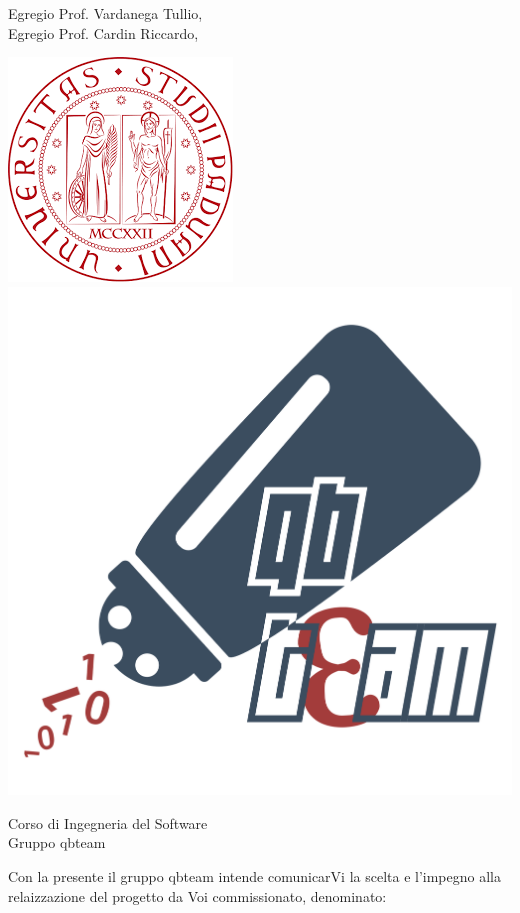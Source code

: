 \documentclass[12pt]{letter}
\begin{document}
    \begin{letter}
        { Egregio Prof. Vardanega Tullio,\\Egregio Prof. Cardin Riccardo,}
        \begin{center}
            \includegraphics[scale=0.5]{../Utilita/Immagini/logoUnipd.png}
            \includegraphics[scale=0.095]{../Utilita/Immagini/qbteam.png}
        \end{center}
        {
            Corso di Ingegneria del Software\\ Gruppo qbteam
        }
        \opening{ Con la presente il gruppo qbteam intende comunicarVi la scelta e l'impegno alla relaizzazione del progetto da Voi commissionato, denominato:}
        \begin{center}

\end{center}
\end{letter}
\end{document}
